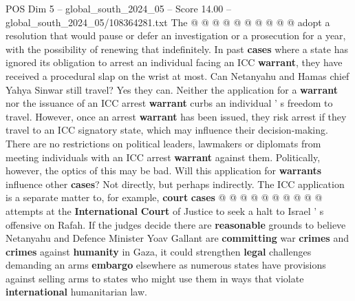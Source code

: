 \begin{textsample}{POS Dim 5 – global\_south\_2024\_05 – Score 14.00 – global\_south\_2024\_05/108364281.txt}
The @ @ @ @ @ @ @ @ @ @ adopt a resolution that would pause or defer an investigation or a prosecution for a year, with the possibility of renewing that indefinitely.
In past \textbf{cases} where a state has ignored its obligation to arrest an individual facing an ICC \textbf{warrant}, they have received a procedural slap on the wrist at most.
Can Netanyahu and Hamas chief Yahya Sinwar still travel?
Yes they can.
Neither the application for a \textbf{warrant} nor the issuance of an ICC arrest \textbf{warrant} curbs an individual ' s freedom to travel.
However, once an arrest \textbf{warrant} has been issued, they risk arrest if they travel to an ICC signatory state, which may influence their decision-making.
There are no restrictions on political leaders, lawmakers or diplomats from meeting individuals with an ICC arrest \textbf{warrant} against them.
Politically, however, the optics of this may be bad.
Will this application for \textbf{warrants} influence other \textbf{cases}?
Not directly, but perhaps indirectly.
The ICC application is a separate matter to, for example, \textbf{court} \textbf{cases} @ @ @ @ @ @ @ @ @ @ attempts at the \textbf{International} \textbf{Court} of Justice to seek a halt to Israel ' s offensive on Rafah.
If the judges decide there are \textbf{reasonable} grounds to believe Netanyahu and Defence Minister Yoav Gallant are \textbf{committing} war \textbf{crimes} and \textbf{crimes} against \textbf{humanity} in Gaza, it could strengthen \textbf{legal} challenges demanding an arms \textbf{embargo} elsewhere as numerous states have provisions against selling arms to states who might use them in ways that violate \textbf{international} humanitarian law.

\end{textsample}
